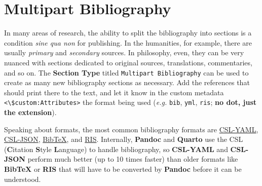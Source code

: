 \documentclass[
  12pt,
  a4paper,
  oneside,
  numbers=noenddot,
  titlepage,
  toclink=all,
  toc=bibliography]{scrbook}
\theoremstyle{definition}
\theoremstyle{definition}
\theoremstyle{definition}
\theoremstyle{plain}
\theoremstyle{plain}
\theoremstyle{plain}
\theoremstyle{plain}
\theoremstyle{plain}
\theoremstyle{remark}
\begin{document}
\hypertarget{sec-scriv42}{%
\section{Multipart Bibliography}\label{sec-scriv42}}

In many areas of research, the ability to split the bibliography into
sections is a condition \emph{sine qua non} for publishing. In the
humanities, for example, there are usually \emph{primary} and
\emph{secondary} sources. In philosophy, even, they can be very nuanced
with sections dedicated to original sources, translations, commentaries,
and so on. The \textbf{Section Type} titled
\texttt{Multipart\ Bibliography} can be used to create as many new
bibliography sections as necessary. Add the references that should print
there to the text, and let it know in the custom metadata
\texttt{\textless{}\textbackslash{}\$custom:Attributes\textgreater{}}
the format being used (\emph{e.g.} \texttt{bib}, \texttt{yml},
\texttt{ris}; \textbf{no dot, just the extension}).

\begin{tcolorbox}[enhanced jigsaw, titlerule=0mm, left=2mm, toptitle=1mm, colback=white, coltitle=black, rightrule=.15mm, arc=.35mm, title=\textcolor{quarto-callout-tip-color}{\faLightbulb}\hspace{0.5em}{Bibliography formats}, colframe=quarto-callout-tip-color-frame, bottomrule=.15mm, colbacktitle=quarto-callout-tip-color!10!white, toprule=.15mm, breakable, bottomtitle=1mm, opacityback=0, opacitybacktitle=0.6, leftrule=.75mm]

Speaking about formats, the most common bibliography formats are
\href{https://docs.citationstyles.org/en/stable/specification.html}{CSL-YAML},
\href{https://docs.citationstyles.org/en/stable/specification.html}{CSL-JSON},
\href{https://en.wikipedia.org/wiki/BibTeX\#Entry_types}{BibTeX}, and
\href{https://en.wikipedia.org/wiki/RIS_(file_format)\#Type_of_reference}{RIS}.
Internally, \textbf{Pandoc} and \textbf{Quarto} use the CSL
(\textbf{C}itation \textbf{S}tyle \textbf{L}anguage) to handle
bibliography, so \textbf{CSL-YAML} and \textbf{CSL-JSON} perform much
better (up to 10 times faster) than older formats like \textbf{BibTeX}
or \textbf{RIS} that will have to be converted by \textbf{Pandoc} before
it can be understood.

\end{tcolorbox}
\end{document}
